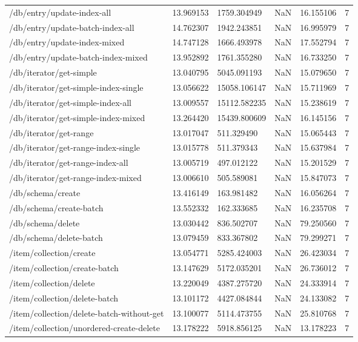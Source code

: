 \begin{tabularx}{\linewidth}{XXXXXX}
/db/entry/update-index-all & 13.969153 & 1759.304949 & NaN & 16.155106 & 7 \\
/db/entry/update-batch-index-all & 14.762307 & 1942.243851 & NaN & 16.995979 & 7 \\
/db/entry/update-index-mixed & 14.747128 & 1666.493978 & NaN & 17.552794 & 7 \\
/db/entry/update-batch-index-mixed & 13.952892 & 1761.355280 & NaN & 16.733250 & 7 \\
/db/iterator/get-simple & 13.040795 & 5045.091193 & NaN & 15.079650 & 7 \\
/db/iterator/get-simple-index-single & 13.056622 & 15058.106147 & NaN & 15.711969 & 7 \\
/db/iterator/get-simple-index-all & 13.009557 & 15112.582235 & NaN & 15.238619 & 7 \\
/db/iterator/get-simple-index-mixed & 13.264420 & 15439.800609 & NaN & 16.145156 & 7 \\
/db/iterator/get-range & 13.017047 & 511.329490 & NaN & 15.065443 & 7 \\
/db/iterator/get-range-index-single & 13.015778 & 511.379343 & NaN & 15.637984 & 7 \\
/db/iterator/get-range-index-all & 13.005719 & 497.012122 & NaN & 15.201529 & 7 \\
/db/iterator/get-range-index-mixed & 13.006610 & 505.589081 & NaN & 15.847073 & 7 \\
/db/schema/create & 13.416149 & 163.981482 & NaN & 16.056264 & 7 \\
/db/schema/create-batch & 13.552332 & 162.333685 & NaN & 16.235708 & 7 \\
/db/schema/delete & 13.030442 & 836.502707 & NaN & 79.250560 & 7 \\
/db/schema/delete-batch & 13.079459 & 833.367802 & NaN & 79.299271 & 7 \\
/item/collection/create & 13.054771 & 5285.424003 & NaN & 26.423034 & 7 \\
/item/collection/create-batch & 13.147629 & 5172.035201 & NaN & 26.736012 & 7 \\
/item/collection/delete & 13.220049 & 4387.275720 & NaN & 24.333914 & 7 \\
/item/collection/delete-batch & 13.101172 & 4427.084844 & NaN & 24.133082 & 7 \\
/item/collection/delete-batch-without-get & 13.100077 & 5114.473755 & NaN & 25.810768 & 7 \\
/item/collection/unordered-create-delete & 13.178222 & 5918.856125 & NaN & 13.178223 & 7 \\

\end{tabularx}
